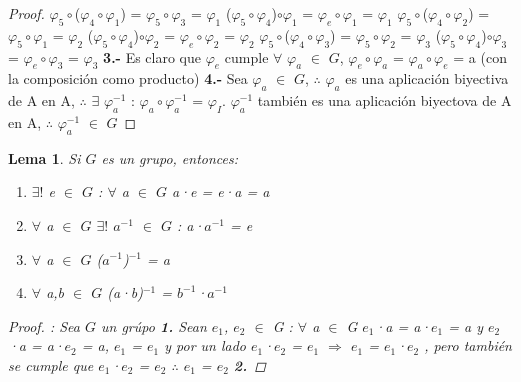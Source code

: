 \documentclass[10pt,a4paper,oneside]{article}
\newtheorem{lem}{Lema}[section]
\begin{document}
\begin{proof}
				$\varphi_{5}\circ$($\varphi_{4}\circ\varphi_{1}$) = $\varphi_{5}\circ\varphi_{3}$ = $\varphi_{1}$
				\newline
				($\varphi_{5}\circ\varphi_{4}$)$\circ\varphi_{1}$ = $\varphi_{e}\circ\varphi_{1}$ = $\varphi_{1}$
				\newline
				\newline
				$\varphi_{5}\circ$($\varphi_{4}\circ\varphi_{2}$) = $\varphi_{5}\circ\varphi_{1}$ = $\varphi_{2}$
				\newline
				($\varphi_{5}\circ\varphi_{4}$)$\circ\varphi_{2}$ = $\varphi_{e}\circ\varphi_{2}$ = $\varphi_{2}$
				\newline
				\newline
				$\varphi_{5}\circ$($\varphi_{4}\circ\varphi_{3}$) = $\varphi_{5}\circ\varphi_{2}$ = $\varphi_{3}$
				\newline
				($\varphi_{5}\circ\varphi_{4}$)$\circ\varphi_{3}$ = $\varphi_{e}\circ\varphi_{3}$ = $\varphi_{3}$
				\newline
				\newline
				\textbf{3.-}
				Es claro que $\varphi_{e}$ cumple $\forall$ $\varphi_{a}$ $\in$ $G$, $\varphi_{e}\circ\varphi_{a}$ = $\varphi_{a}\circ\varphi_{e}$ = a (con la composición como producto)
				\newline
				\newline
				\textbf{4.-}
				Sea $\varphi_{a}$ $\in$ $G$, $\therefore$ $\varphi_{a}$ es una aplicación biyectiva de A en A, $\therefore$ $\exists$ $\varphi_{a}^{-1}$ : $\varphi_{a}\circ\varphi_{a}^{-1}$ = $\varphi_{I}$. $\varphi_{a}^{-1}$ también es una aplicación biyectova de A en A, $\therefore$ $\varphi_{a}^{-1}$ $\in$ $G$
				\newline
			\end{proof}

			\begin{lem}
				Si $G$ es un grupo, entonces:
				\begin{enumerate}
					\item $\exists!$ e $\in$ $G$ : $\forall$ a $\in$ $G$ a·e = e·a = a
					\item $\forall$ a $\in$ $G$ $\exists!$ $a^{-1}$ $\in$ $G$ : a·$a^{-1}$ = e
					\item $\forall$ a $\in$ $G$ ($a^{-1}$)$^{-1}$ = a
					\item $\forall$ a,b $\in$ $G$ (a·b)$^{-1}$ = $b^{-1}$·$a^{-1}$
				\end{enumerate}
				\begin{proof}:
					\newline
					Sea $G$ un grúpo
					\newline
					\newline
					\textbf{1.} Sean $e_{1}$, $e_{2}$ $\in$ G : $\forall$ a $\in$ G $e_{1}$·a = a·$e_{1}$ = a y $e_{2}$·a = a·$e_{2}$ = a, $e_{1}$ = $e_{1}$ y por un lado $e_{1}$·$e_{2}$ = $e_{1}$ $\Rightarrow$ $e_{1}$ = $e_{1}$·$e_{2}$ ,  pero también se cumple que $e_{1}$·$e_{2}$ = $e_{2}$ $\therefore$ $e_{1}$ = $e_{2}$
					\newline
					\newline
					\textbf{2.} 

				\end{proof}
			\end{lem}
\end{document}

